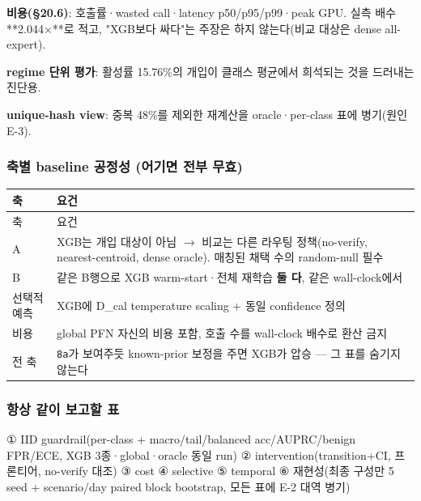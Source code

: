 \par\noindent \textbullet\enspace \textbf{비용(§20.6)}: 호출률·wasted call·latency p50/\allowbreak{}p95/\allowbreak{}p99·peak GPU. 실측 배수 **2.044×**로 적고, "XGB보다 싸다"는 주장은 하지 않는다(비교 대상은 dense all-expert).


\par\noindent \textbullet\enspace \textbf{regime 단위 평가}: 활성률 15.76\%의 개입이 클래스 평균에서 희석되는 것을 드러내는 진단용.


\par\noindent \textbullet\enspace \textbf{unique-hash view}: 중복 48\%를 제외한 재계산을 oracle·per-class 표에 병기(원인 E-3).


\subsubsection{축별 baseline 공정성 (어기면 전부 무효)}
\begingroup
\footnotesize
\begin{longtable}{>{\raggedright\arraybackslash}p{}>{\raggedright\arraybackslash}p{}}
\toprule
축 & 요건 \\ \midrule
\endfirsthead
축 & 요건 \\ \midrule
\endhead
{}A & XGB는 개입 대상이 아님  \ensuremath{\rightarrow}  비교는 다른 라우팅 정책(no-verify, nearest-centroid, dense oracle). 매칭된 채택 수의 random-null 필수 \\
{}B & 같은 B행으로 XGB warm-start·전체 재학습 \textbf{둘 다}, 같은 wall-clock에서 \\
{}선택적 예측 & XGB에 D\_\allowbreak{}cal temperature scaling +\allowbreak{} 동일 confidence 정의 \\
{}비용 & global PFN 자신의 비용 포함, 호출 수를 wall-clock 배수로 환산 금지 \\
{}전 축 & \texttt{8a}가 보여주듯 known-prior 보정을 주면 XGB가 압승 — 그 표를 숨기지 않는다 \\
\bottomrule
\end{longtable}
\endgroup
\subsubsection{항상 같이 보고할 표}
① IID guardrail(per-class +\allowbreak{} macro/\allowbreak{}tail/\allowbreak{}balanced acc/\allowbreak{}AUPRC/\allowbreak{}benign FPR/\allowbreak{}ECE, XGB 3종·global·oracle 동일 run) ② intervention(transition+\allowbreak{}CI, 프론티어, no-verify 대조) ③ cost ④ selective ⑤ temporal ⑥ 재현성(최종 구성만 5 seed +\allowbreak{} scenario/\allowbreak{}day paired block bootstrap, 모든 표에 E-2 대역 병기)


